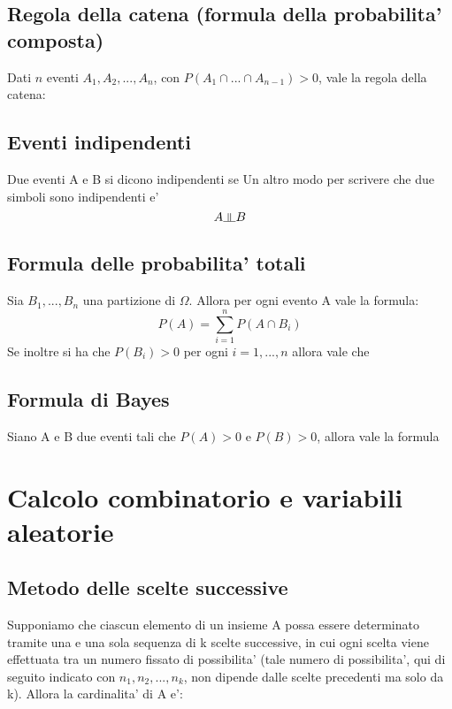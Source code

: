 \documentclass{article}
\newcommand{\indep}{\rotatebox[origin=c]{90}{$\models$}}
\begin{document}
\subsection{Regola della catena (formula della probabilita' composta)}
Dati $n$ eventi $A_1, A_2,..., A_n$, con $P(A_1 \cap ... \cap A_{n - 1}) > 0$, vale la regola
della catena:\newline
{}

\subsection{Eventi indipendenti}
Due eventi A e B si dicono indipendenti se \newline
{}\newline
Un altro modo per scrivere che due simboli sono indipendenti e'\newline
$$ A \indep B $$

\subsection{Formula delle probabilita' totali}
Sia $B_1,...,B_n$ una partizione di $\Omega$. Allora per ogni evento A vale la formula:\newline
$$ P(A) = \sum_{i=1}^{n}P(A\cap B_i)$$\newline
Se inoltre si ha che $P(B_i) > 0$ per ogni $i = 1,...,n$ allora vale che\newline
{}

\subsection{Formula di Bayes}
Siano A e B due eventi tali che $P(A)>0$ e $P(B)>0$, allora vale la formula \newline
{}


\newpage



\section{Calcolo combinatorio e variabili aleatorie}
\subsection{Metodo delle scelte successive}
Supponiamo che ciascun elemento di un insieme A possa essere determinato tramite una e una sola sequenza di k scelte successive, in cui ogni scelta viene effettuata tra un numero fissato di possibilita' (tale numero di possibilita', qui di seguito indicato con $n_1, n_2,..., n_k$, non dipende dalle scelte precedenti ma solo da k).\newline
Allora la cardinalita' di A e':\newline
{}
\end{document}
